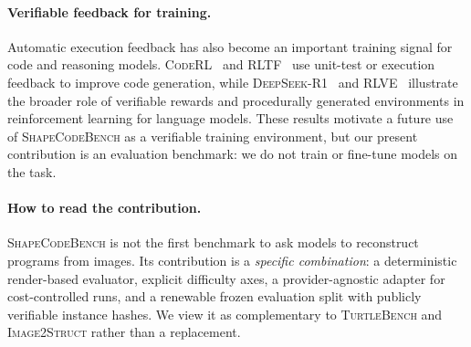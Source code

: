 \paragraph{Verifiable feedback for training.}
Automatic execution feedback has also become an important training signal for
code and reasoning models. \textsc{CodeRL}~\cite{le2022coderl} and
\textsc{RLTF}~\cite{liu2023rltf} use unit-test or execution feedback to improve
code generation, while \textsc{DeepSeek-R1}~\cite{guo2025deepseekr1} and
\textsc{RLVE}~\cite{zeng2025rlve} illustrate the broader role of verifiable
rewards and procedurally generated environments in reinforcement learning for
language models. These results motivate a future use of \textsc{ShapeCodeBench} as a
verifiable training environment, but our present contribution is an evaluation
benchmark: we do not train or fine-tune models on the task.

\paragraph{How to read the contribution.}
\textsc{ShapeCodeBench} is not the first benchmark to ask models to reconstruct
programs from images. Its contribution is a \emph{specific combination}:
a deterministic render-based evaluator, explicit difficulty axes, a
provider-agnostic adapter for cost-controlled runs, and a renewable frozen
evaluation split with publicly verifiable instance hashes. We view it as
complementary to \textsc{TurtleBench} and \textsc{Image2Struct} rather than a
replacement.
